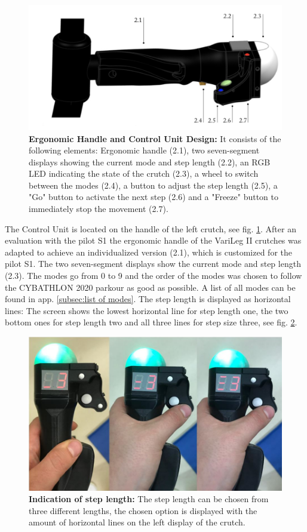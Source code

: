 \documentclass[conference,a4paper]{IEEEtran}
\begin{document}
\begin{figure}[!t]
	\centering
	\includegraphics[width=1\columnwidth]{Images/Results/ergonomic_handle.png}
	\caption{\textbf{Ergonomic Handle and Control Unit Design:} It consists of the following elements: Ergonomic handle (2.1), two seven-segment displays showing the current mode and step length (2.2), an  RGB LED indicating the state of the crutch (2.3), a wheel to switch between the modes (2.4), a button to adjust the step length (2.5), a "Go" button to activate the next step (2.6) and a "Freeze" button to immediately stop the movement (2.7).}
	\label{ergonomic_handle}
\end{figure}
The Control Unit is located on the handle of the left crutch, see fig. \ref{ergonomic_handle}. After an evaluation with the pilot S1 the ergonomic handle of the VariLeg II crutches was adapted to achieve an individualized version (2.1), which is customized for the pilot S1. The two seven-segment displays show the current mode and step length (2.3). The modes go from 0 to 9 and the order of the modes was chosen to follow the CYBATHLON 2020 parkour as good as possible. A list of all modes can be found in app. \ref{subsec:list of modes}. The step length is displayed as horizontal lines: The screen shows the lowest horizontal line for step length one, the two bottom ones for step length two and all three lines for step size three, see fig. \ref{fig:steplength}. \\
\begin{figure}
    \centering
    \includegraphics[width=1\columnwidth]{Images/Results/steplength.JPG}
    \caption{\textbf{Indication of step length:} The step length can be chosen from three different lengths, the chosen option is displayed with the amount of horizontal lines on the left display of the crutch.}
    \label{fig:steplength}
\end{figure}
\end{document}
